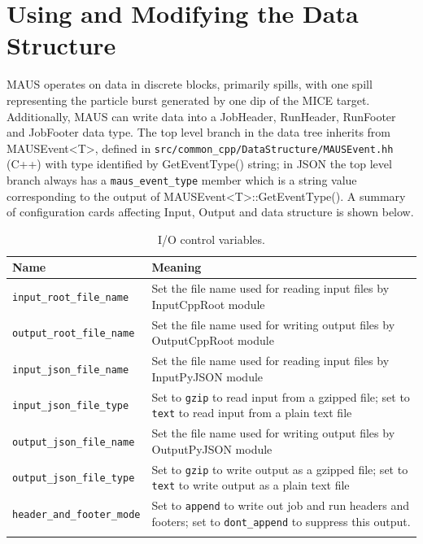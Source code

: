 \chapter{Using and Modifying the Data Structure}
\label{chapter:data_structure}
MAUS operates on data in discrete blocks, primarily spills, with one spill representing the particle burst generated by one dip of the MICE target. Additionally, MAUS can write data into a JobHeader, RunHeader, RunFooter and JobFooter data type. The top level branch in the data tree inherits from MAUSEvent<T>, defined in \verb|src/common_cpp/DataStructure/MAUSEvent.hh| (C++) with type identified by GetEventType() string; in JSON the top level branch always has a \verb|maus_event_type| member which is a string value corresponding to the output of MAUSEvent<T>::GetEventType(). A summary of configuration cards affecting Input, Output and data structure is shown below.

\begin{table}
\begin{center}
\caption{I/O control variables.}
\begin{tabularx}{\linewidth}{lX}
Name & Meaning \\
\hline
\verb|input_root_file_name| & Set the file name used for reading input files by InputCppRoot module \\
\verb|output_root_file_name| & Set the file name used for writing output files by OutputCppRoot module  \\
\hline
\verb|input_json_file_name| & Set the file name used for reading input files by InputPyJSON module \\
\verb|input_json_file_type| & Set to \verb|gzip| to read input from a gzipped file; set to \verb|text| to read input from a plain text file \\
\verb|output_json_file_name| & Set the file name used for writing output files by OutputPyJSON module \\
\verb|output_json_file_type| & Set to \verb|gzip| to write output as a gzipped file; set to \verb|text| to write output as a plain text file  \\
\hline
\verb|header_and_footer_mode| & Set to \verb|append| to write out job and run headers and footers; set to \verb|dont_append| to suppress this output. \\
\begin{makeimage} %
\end{makeimage} 
\end{tabularx}
\end{center}
\end{table}

